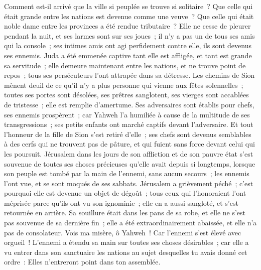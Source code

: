 \begin{multicols}{2}
\VerseOne{} Comment est-il arrivé que la ville si peuplée se trouve si solitaire~? Que celle qui était grande entre les nations est devenue comme une veuve~? Que celle qui était noble dame entre les provinces a été rendue tributaire~?
 Elle ne cesse de pleurer pendant la nuit, et ses larmes sont sur ses joues~; il n'y a pas un de tous ses amis qui la console~; ses intimes amis ont agi perfidement contre elle, ils sont devenus ses ennemis.
 Juda a été emmenée captive tant elle est affligée, et tant est grande sa servitude~; elle demeure maintenant entre les nations, et ne trouve point de repos~; tous ses persécuteurs l'ont attrapée dans sa détresse.
 Les chemins de Sion mènent deuil de ce qu'il n'y a plus personne qui vienne aux fêtes solennelles~; toutes ses portes sont désolées, ses prêtres sanglotent, ses vierges sont accablées de tristesse~; elle est remplie d'amertume.
 Ses adversaires sont établis pour chefs, ses ennemis prospèrent~; car Yahweh l'a humiliée à cause de la multitude de ses transgressions~; ses petits enfants ont marché captifs devant l'adversaire.
 Et tout l'honneur de la fille de Sion s'est retiré d'elle~; ses chefs sont devenus semblables à des cerfs qui ne trouvent pas de pâture, et qui fuient sans force devant celui qui les poursuit.
 Jérusalem dans les jours de son affliction et de son pauvre état s'est souvenue de toutes ses choses précieuses qu'elle avait depuis si longtemps, lorsque son peuple est tombé par la main de l'ennemi, sans aucun secours~; les ennemis l'ont vue, et se sont moqués de ses sabbats.
 Jérusalem a grièvement péché~; c'est pourquoi elle est devenue un objet de dégoût~; tous ceux qui l'honoraient l'ont méprisée parce qu'ils ont vu son ignominie~; elle en a aussi sangloté, et s'est retournée en arrière.
 Sa souillure était dans les pans de sa robe, et elle ne s'est pas souvenue de sa dernière fin~; elle a été extraordinairement abaissée, et elle n'a pas de consolateur. Vois ma misère, ô Yahweh~! Car l'ennemi s'est élevé avec orgueil~!
 L'ennemi a étendu sa main sur toutes ses choses désirables~; car elle a vu entrer dans son sanctuaire les nations au sujet desquelles tu avais donné cet ordre~: Elles n'entreront point dans ton assemblée.

\end{multicols}
